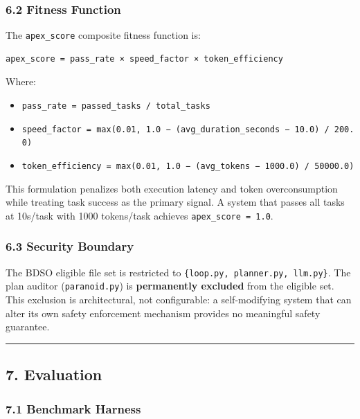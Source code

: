 \documentclass[
]{article}
\providecommand{\tightlist}{%
  \setlength{\itemsep}{0pt}\setlength{\parskip}{0pt}}
\begin{document}
\subsubsection{6.2 Fitness Function}\label{62-fitness-function}

The \texttt{apex\_score} composite fitness function is:

\begin{verbatim}
apex_score = pass_rate × speed_factor × token_efficiency
\end{verbatim}

Where:

\begin{itemize}
\tightlist
\item
  \texttt{pass\_rate\ =\ passed\_tasks\ /\ total\_tasks}
\item
  \texttt{speed\_factor\ =\ max(0.01,\ 1.0\ −\ (avg\_duration\_seconds\ −\ 10.0)\ /\ 200.0)}
\item
  \texttt{token\_efficiency\ =\ max(0.01,\ 1.0\ −\ (avg\_tokens\ −\ 1000.0)\ /\ 50000.0)}
\end{itemize}

This formulation penalizes both execution latency and token
overconsumption while treating task success as the primary signal. A
system that passes all tasks at 10s/task with 1000 tokens/task achieves
\texttt{apex\_score\ =\ 1.0}.

\subsubsection{6.3 Security Boundary}\label{63-security-boundary}

The BDSO eligible file set is restricted to
\texttt{\{loop.py,\ planner.py,\ llm.py\}}. The plan auditor
(\texttt{paranoid.py}) is \textbf{permanently excluded} from the
eligible set. This exclusion is architectural, not configurable: a
self-modifying system that can alter its own safety enforcement
mechanism provides no meaningful safety guarantee.

\begin{center}\rule{0.5\linewidth}{0.5pt}\end{center}

\subsection{7. Evaluation}\label{7-evaluation}

\subsubsection{7.1 Benchmark Harness}\label{71-benchmark-harness}
\end{document}
